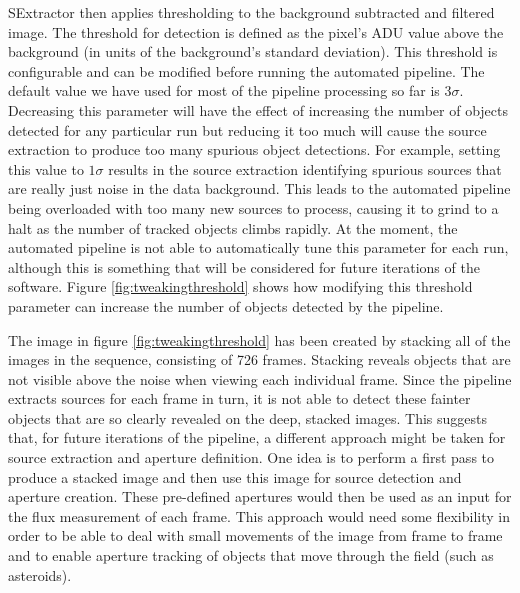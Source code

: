 SExtractor then applies thresholding to the background subtracted and filtered image. The threshold for detection is defined as the pixel's ADU value above the background (in units of the background's standard deviation). This threshold is configurable and can be modified before running the automated pipeline. The default value we have used for most of the pipeline processing so far is $3\sigma$. Decreasing this parameter will have the effect of increasing the number of objects detected for any particular run but reducing it too much will cause the source extraction to produce too many spurious object detections. For example, setting this value to $1\sigma$ results in the source extraction identifying spurious sources that are really just noise in the data background. This leads to the automated pipeline being overloaded with too many new sources to process, causing it to grind to a halt as the number of tracked objects climbs rapidly. At the moment, the automated pipeline is not able to automatically tune this parameter for each run, although this is something that will be considered for future iterations of the software. Figure \ref{fig:tweakingthreshold} shows how modifying this threshold parameter can increase the number of objects detected by the pipeline.

The image in figure \ref{fig:tweakingthreshold} has been created by stacking all of the images in the sequence, consisting of 726 frames. Stacking reveals objects that are not visible above the noise when viewing each individual frame. Since the pipeline extracts sources for each frame in turn, it is not able to detect these fainter objects that are so clearly revealed on the deep, stacked images. This suggests that, for future iterations of the pipeline, a different approach might be taken for source extraction and aperture definition. One idea is to perform a first pass to produce a stacked image and then use this image for source detection and aperture creation. These pre-defined apertures would then be used as an input for the flux measurement of each frame. This approach would need some flexibility in order to be able to deal with small movements of the image from frame to frame and to enable aperture tracking of objects that move through the field (such as asteroids).

